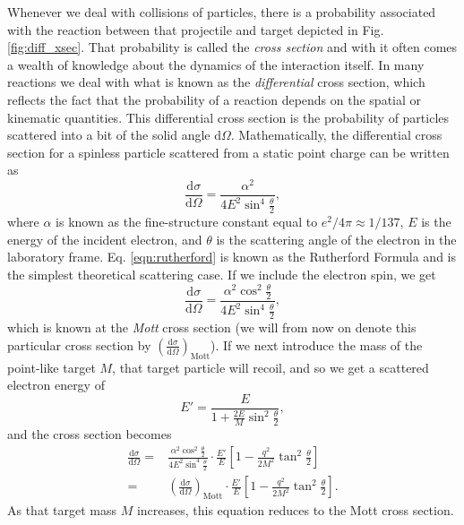 Whenever we deal with collisions of particles, there is a probability associated with the reaction between that projectile and target depicted in Fig. \ref{fig:diff_xsec}. That probability is called the \textit{cross section} and with it often comes a wealth of knowledge about the dynamics of the interaction itself. In many reactions we deal with what is known as the \textit{differential} cross section, which reflects the fact that the probability of a reaction depends on the spatial or kinematic quantities. This differential cross section is the probability of particles scattered into a bit of the solid angle $\mathrm{d}\Omega$. Mathematically, the differential cross section for a spinless particle scattered from a static point charge can be written \cite{book:parts_nucs} as  
\begin{equation}
\label{eqn:rutherford}
\frac{\mathrm{d}\sigma}{\mathrm{d}\Omega} = \frac{\alpha^2}{4E^2\sin^4 \frac{\theta}{2}},
\end{equation}
where $\alpha$ is known as the fine-structure constant equal to $e^2/4\pi \approx 1/137$, $E$ is the energy of the incident electron, and $\theta$ is the scattering angle of the electron in the laboratory frame. Eq. \ref{eqn:rutherford} is known as the Rutherford Formula and is the simplest theoretical scattering case. If we include the electron spin, we get
\begin{equation}
\label{eqn:mott}
\frac{\mathrm{d}\sigma}{\mathrm{d}\Omega} = \frac{\alpha^2 \cos^2 \frac{\theta}{2}}{4E^2\sin^4 \frac{\theta}{2}},
\end{equation}
which is known at the \textit{Mott} cross section (we will from now on denote this particular cross section by $\left( \tfrac{\mathrm{d}\sigma}{\mathrm{d}\Omega} \right)_{\mathrm{Mott}}$). If we next introduce the mass of the point-like target $M$, that target particle will recoil, and so we get a scattered electron energy of 
\begin{equation}
E' = \frac{E}{1+\frac{2E}{M}\sin^2 \frac{\theta}{2}},
\end{equation}
and the cross section becomes
\begin{eqnarray}
\nonumber
\frac{\mathrm{d}\sigma}{\mathrm{d}\Omega} =& \frac{\alpha^2 \cos^2 \frac{\theta}{2}}{4E^2\sin^4 \frac{\theta}{2}} \cdot \frac{E'}{E} \left[ 1-\frac{q^2}{2M^2}\tan^2 \frac{\theta}{2} \right] \\
=& \left( \frac{\mathrm{d}\sigma}{\mathrm{d}\Omega} \right)_{\mathrm{Mott}} \cdot \frac{E'}{E} \left[ 1-\frac{q^2}{2M^2}\tan^2 \frac{\theta}{2} \right].
\end{eqnarray}
As that target mass $M$ increases, this equation reduces to the Mott cross section. 


